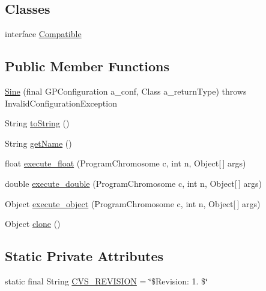 \subsection*{Classes}
\begin{DoxyCompactItemize}
\item 
interface \hyperlink{interfaceorg_1_1jgap_1_1gp_1_1function_1_1_sine_1_1_compatible}{Compatible}
\end{DoxyCompactItemize}
\subsection*{Public Member Functions}
\begin{DoxyCompactItemize}
\item 
\hyperlink{classorg_1_1jgap_1_1gp_1_1function_1_1_sine_a36787b8ae3399fb54c42c06477a5f6ce}{Sine} (final G\-P\-Configuration a\-\_\-conf, Class a\-\_\-return\-Type)  throws Invalid\-Configuration\-Exception 
\item 
String \hyperlink{classorg_1_1jgap_1_1gp_1_1function_1_1_sine_a182b78947d56b934b51debd30d357e33}{to\-String} ()
\item 
String \hyperlink{classorg_1_1jgap_1_1gp_1_1function_1_1_sine_a552989800553538e6e9d74b5565c4a06}{get\-Name} ()
\item 
float \hyperlink{classorg_1_1jgap_1_1gp_1_1function_1_1_sine_a6b1ce1b55e050e1935fb5b3bbc81161b}{execute\-\_\-float} (Program\-Chromosome c, int n, Object\mbox{[}$\,$\mbox{]} args)
\item 
double \hyperlink{classorg_1_1jgap_1_1gp_1_1function_1_1_sine_a8029e01eafc913cfa66d392169662a43}{execute\-\_\-double} (Program\-Chromosome c, int n, Object\mbox{[}$\,$\mbox{]} args)
\item 
Object \hyperlink{classorg_1_1jgap_1_1gp_1_1function_1_1_sine_a3d5d5e4ba91f3c2256c8a2ea6f4f552b}{execute\-\_\-object} (Program\-Chromosome c, int n, Object\mbox{[}$\,$\mbox{]} args)
\item 
Object \hyperlink{classorg_1_1jgap_1_1gp_1_1function_1_1_sine_afab12059d107ec73003eb4935a4fec8b}{clone} ()
\end{DoxyCompactItemize}
\subsection*{Static Private Attributes}
\begin{DoxyCompactItemize}
\item 
static final String \hyperlink{classorg_1_1jgap_1_1gp_1_1function_1_1_sine_a1b1a1685a14ea71515178805c55fa677}{C\-V\-S\-\_\-\-R\-E\-V\-I\-S\-I\-O\-N} = \char`\"{}\$Revision\-: 1. \$\char`\"{}
\end{DoxyCompactItemize}
